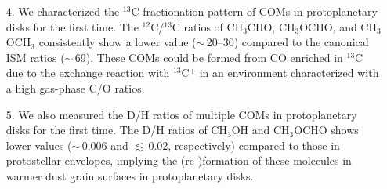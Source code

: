 \documentclass[twocolumn, twocolappendix, astrosymb, times]{aastex631}
\newcommand{\methanol}{CH$_3$OH\xspace}
\newcommand{\acetaldehyde}{CH$_3$CHO\xspace}
\newcommand{\methylformate}{CH$_3$OCHO\xspace}
\newcommand{\dimethylether}{CH$_3$OCH$_3$\xspace}
\begin{document}
\begin{enumerate}
    \item[4.] We characterized the $^{13}$C-fractionation pattern of COMs in protoplanetary disks for the first time. The $^{12}$C/$^{13}$C ratios of \acetaldehyde, \methylformate, and \dimethylether consistently show a lower value ($\sim$\,20--30) compared to the canonical ISM ratios ($\sim$\,69). These COMs could be formed from CO enriched in $^{13}$C due to the exchange reaction with $^{13}$C$^+$ in an environment characterized with a high gas-phase C/O ratios.
    \item[5.]  We also measured the D/H ratios of multiple COMs in protoplanetary disks for the first time. The D/H ratios of \methanol and \methylformate shows lower values ($\sim$\,0.006 and $\lesssim$\,0.02, respectively) compared to those in protostellar envelopes, implying the (re-)formation of these molecules in warmer dust grain surfaces in protoplanetary disks. 
\end{enumerate}
\end{document}
